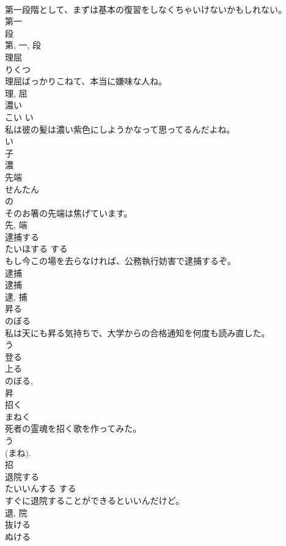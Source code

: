 \documentclass[8pt]{extreport}
\begin{document}
\begin{CJK}{UTF8}{min}
\\	第一段階として、まずは基本の復習をしなくちゃいけないかもしれない。	
\\	第一 
\\	段 
\\	第, 一, 段	
\\	理屈	
\\	りくつ	
\\	理屈ばっかりこねて、本当に嫌味な人ね。	
\\	理, 屈	
\\	濃い	
\\	こい	い 
\\	私は彼の髪は濃い紫色にしようかなって思ってるんだよね。	
\\	い 
\\	子 
\\	濃	
\\	先端	
\\	せんたん	
\\	の 
\\	そのお箸の先端は焦げています。	
\\	先, 端	
\\	逮捕する	
\\	たいほする	する 
\\	もし今この場を去らなければ、公務執行妨害で逮捕するぞ。	
\\	逮捕 
\\	逮捕 
\\	逮, 捕	
\\	昇る	
\\	のぼる	
\\	私は天にも昇る気持ちで、大学からの合格通知を何度も読み直した。	
\\	う 
\\	登る 
\\	上る 
\\	のぼる, 
\\	昇	
\\	招く	
\\	まねく	
\\	死者の霊魂を招く歌を作ってみた。	
\\	う 
\\	(まね). 
\\	招	
\\	退院する	
\\	たいいんする	する 
\\	すぐに退院することができるといいんだけど。	
\\	退, 院	
\\	抜ける	
\\	ぬける	

\end{CJK}
\end{document}
